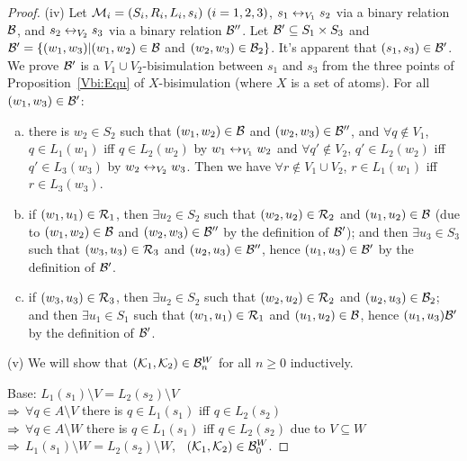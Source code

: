\documentclass{article}
\begin{document}
\begin{proof}
(iv) Let ${\cal M}_i=(S_i,R_i,L_i,s_i)~(i=1,2,3)$, $s_1 \leftrightarrow_{V_1} s_2$ via a binary relation ${\cal B}$, and $s_2 \leftrightarrow_{V_2} s_3$ via a binary relation ${\cal B}''$. Let ${\cal B}' \subseteq S_1 \times S_3$ and ${\cal B}' = \{(w_1, w_3)| (w_1, w_2)\in {\cal B}$ and $(w_2, w_3)\in {\cal B}_2\}$. It's apparent that $(s_1, s_3) \in {\cal B}'$. We prove ${\cal B}'$ is a $V_1 \cup V_2$-bisimulation between $s_1$ and $s_3$ from the three points of Proposition~\ref{Vbi:Equ} of $X$-bisimulation (where $X$ is a set of atoms). For all $(w_1, w_3) \in {\cal B}'$:
\begin{enumerate}[(a)]
  \item there is $w_2 \in S_2$ such that $(w_1,w_2)\in {\cal B}$ and $(w_2, w_3)\in {\cal B}''$, and $\forall q \notin V_1$, $q \in L_1(w_1)$ iff $q \in L_2(w_2)$ by $w_1 \leftrightarrow_{V_1} w_2$ and $\forall q' \notin V_2$, $q'\in L_2(w_2)$ iff $q'\in L_3(w_3)$ by $w_2 \leftrightarrow_{V_2} w_3$. Then we have $\forall r\notin V_1 \cup V_2$, $r \in L_1(w_1)$ iff $r \in L_3(w_3)$.
  \item if $(w_1, u_1) \in {\cal R}_1$, then $\exists u_2\in S_2$ such that $(w_2, u_2) \in {\cal R}_2$ and $(u_1,u_2)\in {\cal B}$ (due to $(w_1,w_2)\in {\cal B}$ and $(w_2, w_3) \in {\cal B}''$ by the definition of ${\cal B}'$); and then $\exists u_3 \in S_3$ such that $(w_3, u_3) \in {\cal R}_3$ and $(u_2, u_3) \in {\cal B}''$, hence $(u_1, u_3) \in {\cal B}'$ by the definition of ${\cal B}'$.
  \item if $(w_3, u_3) \in {\cal R}_3$, then $\exists u_2\in S_2$ such that $(w_2, u_2) \in {\cal R}_2$ and $(u_2, u_3) \in {\cal B}_2$; and then $\exists u_1 \in S_1$ such that $(w_1, u_1) \in {\cal R}_1$ and $(u_1, u_2) \in {\cal B}$, hence $(u_1, u_3) {\cal B}'$ by the definition of ${\cal B}'$.
\end{enumerate}

(v) We will show that $({\cal K}_1, {\cal K}_2) \in {\cal B}_n^W$ for all $n \ge 0$ inductively.

Base: $L_1(s_1) \setminus V = L_2(s_2) \setminus V$\\
$\Rightarrow$ $\forall q \in A\setminus V$ there is $q \in L_1(s_1)$ iff $q \in L_2(s_2)$\\
$\Rightarrow$ $\forall q \in A\setminus W$ there is $q \in L_1(s_1)$ iff $q \in L_2(s_2)$ due to $V \subseteq W$\\
$\Rightarrow$ $L_1(s_1) \setminus W = L_2(s_2) \setminus W$, \ie\ $({\cal K}_1, {\cal K}_2) \in {\cal B}_0^W$.


\end{proof}
\end{document}

